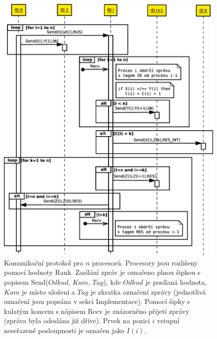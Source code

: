 \documentclass[a4paper,12pt]{article}
\begin{document}
\begin{figure}
  \centering
  \includegraphics[scale=0.3]{Figures/SequenceDiagramCompress.eps}
  \caption{Komunikační protokol pro $n$ procesorů. Procesory jsou rozlišeny pomocí hodnoty Rank. Zasílání zpráv je 
  označeno plnou šipkou s popisem Send($Odkud$, $Kam$, $Tag$), kde $Odkud$ je posílaná hodnota, $Kam$ je místo uložení 
  a $Tag$ je zkratka označení zprávy (jednotlivá označení jsou popsána v sekci Implementace). Pomocí šipky s kulatým koncem s nápisem Recv je 
  znázorněno přijetí zprávy (zpráva byla odeslána již dříve). Prvek na pozici $i$ vstupní neseřazené 
  posloupnosti je označen jako $I(i)$.}
  \label{fig:seq}
\end{figure}
\end{document}
